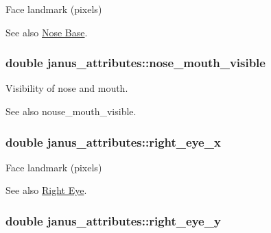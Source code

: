 Face landmark (pixels) 

\begin{DoxySeeAlso}{See also}
\hyperlink{group__janus_nose_base}{Nose Base}. 
\end{DoxySeeAlso}
\hypertarget{structjanus__attributes_a150d6d79cf9a71cc89086f71c7140691}{}
\subsubsection[{nose\+\_\+mouth\+\_\+visible}]{\setlength{\rightskip}{0pt plus 5cm}double janus\+\_\+attributes\+::nose\+\_\+mouth\+\_\+visible}\label{structjanus__attributes_a150d6d79cf9a71cc89086f71c7140691}


Visibility of nose and mouth. 

\begin{DoxySeeAlso}{See also}
nouse\+\_\+mouth\+\_\+visible. 
\end{DoxySeeAlso}
\hypertarget{structjanus__attributes_a2f683b4d1d832b31b6cb6a21c7288e57}{}
\subsubsection[{right\+\_\+eye\+\_\+x}]{\setlength{\rightskip}{0pt plus 5cm}double janus\+\_\+attributes\+::right\+\_\+eye\+\_\+x}\label{structjanus__attributes_a2f683b4d1d832b31b6cb6a21c7288e57}


Face landmark (pixels) 

\begin{DoxySeeAlso}{See also}
\hyperlink{group__janus_right_eye}{Right Eye}. 
\end{DoxySeeAlso}
\hypertarget{structjanus__attributes_aec075ed78bd9488a3be40968e303dbc1}{}
\subsubsection[{right\+\_\+eye\+\_\+y}]{\setlength{\rightskip}{0pt plus 5cm}double janus\+\_\+attributes\+::right\+\_\+eye\+\_\+y}\label{structjanus__attributes_aec075ed78bd9488a3be40968e303dbc1}


